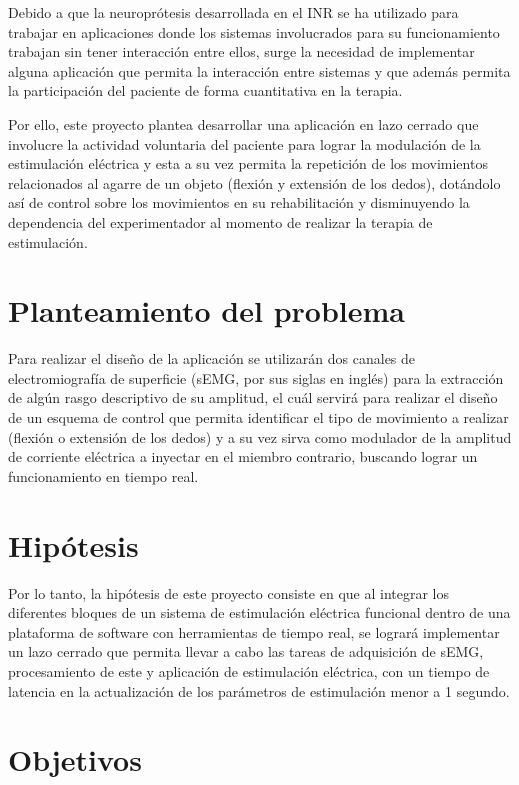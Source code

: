 Debido a que la neuroprótesis desarrollada en el INR se ha utilizado para trabajar en aplicaciones donde los sistemas involucrados para su funcionamiento trabajan sin tener interacción entre ellos, surge la necesidad de implementar alguna aplicación que permita la interacción entre sistemas y que además permita la participación del paciente de forma cuantitativa en la terapia.

Por ello, este proyecto plantea desarrollar una aplicación en lazo cerrado que involucre la actividad voluntaria del paciente para lograr la modulación de la estimulación eléctrica y esta a su vez permita la repetición de los movimientos relacionados al agarre de un objeto (flexión y extensión de los dedos), dotándolo así de control sobre los movimientos en su rehabilitación y disminuyendo la dependencia del experimentador al momento de realizar la terapia de estimulación.

\section{Planteamiento del problema}

Para realizar el diseño de la aplicación se utilizarán dos canales de electromiografía de superficie (sEMG, por sus siglas en inglés) para la extracción de algún rasgo descriptivo de su amplitud, el cuál servirá para realizar el diseño de un esquema de control que permita identificar el tipo de movimiento a realizar (flexión o extensión de los dedos) y a su vez sirva como modulador de la amplitud de corriente eléctrica a inyectar en el miembro contrario, buscando lograr un funcionamiento en tiempo real.

\section{Hipótesis}

Por lo tanto, la hipótesis de este proyecto consiste en que al integrar los diferentes bloques de un sistema de estimulación eléctrica funcional dentro de una plataforma de software con herramientas de tiempo real, se logrará implementar un lazo cerrado que permita llevar a cabo las tareas de adquisición de sEMG, procesamiento de este y aplicación de estimulación eléctrica, con un tiempo de latencia en la actualización de los parámetros de estimulación menor a 1 segundo.

\section{Objetivos}

